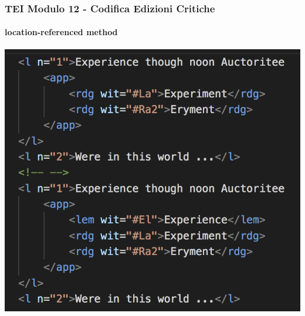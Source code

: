 \begin{frame}
    \frametitle{TEI Modulo 12 - Codifica Edizioni Critiche}
    \framesubtitle{location-referenced method}
    \addtocounter{nframe}{1}
    










    \begin{center}
       \includegraphics[width=.75\textwidth]{imgs/location-referenced-inline.png}
    \end{center}

\end{frame}

